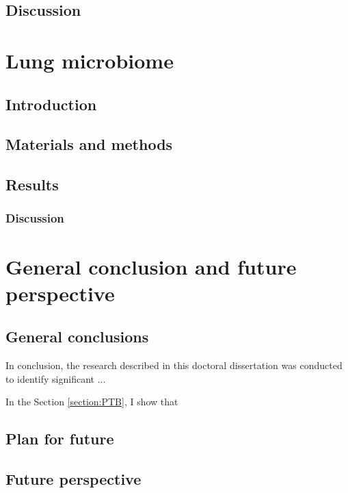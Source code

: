 \documentclass[11pt, a4paper, onecolumn, oneside]{report}
\begin{document}
        \subsection{Discussion}
        \newpage

    \section{Lung microbiome}
        \subsection{Introduction}
        \clearpage

        \subsection{Materials and methods}
        \clearpage

        \subsection{Results}
        \clearpage

        \subsubsection{Discussion}
        \clearpage
    \newpage

    \section{General conclusion and future perspective}
        \label{section:conclusion}
        \subsection{General conclusions}
            In conclusion, the research described in this doctoral dissertation was conducted to identify significant ...

            In the Section \ref{section:PTB}, I show that
        \newpage

        \subsection{Plan for future}
        \newpage

        \subsection{Future perspective}
        \newpage
\end{document}
